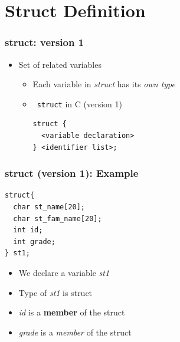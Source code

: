 \documentclass{../c-lecture}
\begin{document}
\section{Struct Definition}

\begin{frame}[fragile]
  \frametitle{struct: version 1}
  \begin{itemize}
    \item Set of related variables
    \begin{itemize}
      \item
        Each variable in \textit{\color{Cyan} struct} has its
        \textit{\color{YellowOrange} own type}

      \item \texttt{\color{Cyan} struct} in C (version 1)
      \begin{verbatim}
struct {
  <variable declaration>
} <identifier list>;
      \end{verbatim}
    \end{itemize}
  \end{itemize}
\end{frame}

\begin{frame}[fragile]
  \frametitle{struct (version 1): Example}
  \begin{verbatim}
struct{
  char st_name[20];
  char st_fam_name[20];
  int id;
  int grade;
} st1;
  \end{verbatim}
  \begin{itemize}
    \item We declare a variable \textit{\color{YellowOrange} st1}
    \item Type of \textit{\color{YellowOrange} st1} is struct
    \item
      \textit{\color{Purple} id} is a
      \textbf{\color{LimeGreen} member} of the struct

    \item
      \textit{\color{Purple} grade} is a
      \textit{\color{LimeGreen}member} of the struct

  \end{itemize}
\end{frame}
\end{document}

